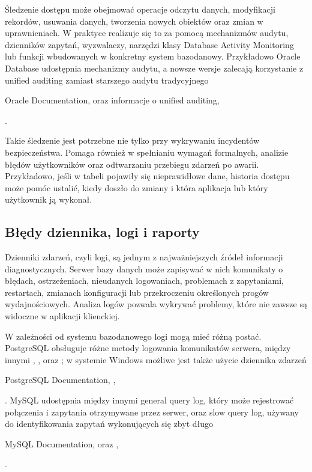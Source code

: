 \documentclass[a4paper,11pt,english,openany,oneside]{sphinxmanual}
\begin{document}
\sphinxAtStartPar
Śledzenie dostępu może obejmować operacje odczytu danych, modyfikacji rekordów, usuwania danych, tworzenia nowych obiektów oraz zmian w uprawnieniach. W praktyce realizuje się to za pomocą mechanizmów audytu, dzienników zapytań, wyzwalaczy, narzędzi klasy Database Activity Monitoring lub funkcji wbudowanych w konkretny system bazodanowy. Przykładowo Oracle Database udostępnia mechanizmy audytu, a nowsze wersje zalecają korzystanie z unified auditing zamiast starszego audytu tradycyjnego %
\begin{footnote}[3]\sphinxAtStartFootnote
Oracle Documentation,  oraz informacje o unified auditing, 
%
\end{footnote}.

\sphinxAtStartPar
Takie śledzenie jest potrzebne nie tylko przy wykrywaniu incydentów bezpieczeństwa. Pomaga również w spełnianiu wymagań formalnych, analizie błędów użytkowników oraz odtwarzaniu przebiegu zdarzeń po awarii. Przykładowo, jeśli w tabeli pojawiły się nieprawidłowe dane, historia dostępu może pomóc ustalić, kiedy doszło do zmiany i która aplikacja lub który użytkownik ją wykonał.


\subsection{Błędy dziennika, logi i raporty}
\label{\detokenize{rozdzial_2/rozdzial_24/index:bledy-dziennika-logi-i-raporty}}
\sphinxAtStartPar
Dzienniki zdarzeń, czyli logi, są jednym z najważniejszych źródeł informacji diagnostycznych. Serwer bazy danych może zapisywać w nich komunikaty o błędach, ostrzeżeniach, nieudanych logowaniach, problemach z zapytaniami, restartach, zmianach konfiguracji lub przekroczeniu określonych progów wydajnościowych. Analiza logów pozwala wykrywać problemy, które nie zawsze są widoczne w aplikacji klienckiej.

\sphinxAtStartPar
W zależności od systemu bazodanowego logi mogą mieć różną postać. PostgreSQL obsługuje różne metody logowania komunikatów serwera, między innymi , ,  oraz ; w systemie Windows możliwe jest także użycie dziennika zdarzeń %
\begin{footnote}[4]\sphinxAtStartFootnote
PostgreSQL Documentation, , 
%
\end{footnote}. MySQL udostępnia między innymi general query log, który może rejestrować połączenia i zapytania otrzymywane przez serwer, oraz slow query log, używany do identyfikowania zapytań wykonujących się zbyt długo %
\begin{footnote}[5]\sphinxAtStartFootnote
MySQL Documentation,  oraz , 
%
\end{footnote}.
\end{document}
